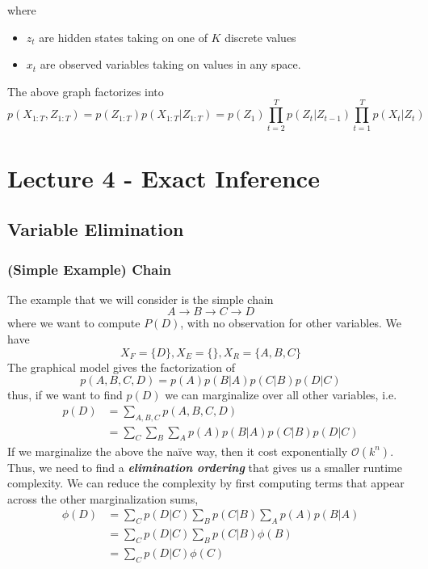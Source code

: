 \documentclass[11pt]{article}
\begin{document}
where
\begin{itemize}
    \item $z_t$ are hidden states taking on one of $K$ discrete values
    \item $x_t$ are observed variables taking on values in any space.
\end{itemize}
The above graph factorizes into
\begin{equation*}
    p\left(X_{1: T}, Z_{1: T}\right)=p\left(Z_{1: T}\right) p\left(X_{1: T} | Z_{1: T}\right)=p\left(Z_{1}\right) \prod_{t=2}^{T} p\left(Z_{t} | Z_{t-1}\right) \prod_{t=1}^{T} p\left(X_{t} | Z_{t}\right)
\end{equation*}

\section{Lecture 4 - Exact Inference}
\subsection{Variable Elimination}
\subsubsection{(Simple Example) Chain}
The example that we will consider is the simple chain
\begin{equation*}
    A \rightarrow B \rightarrow C \rightarrow D
\end{equation*}
where we want to compute $P(D)$, with no observation for other variables. We have
\begin{equation*}
    X_{F}=\{D\}, X_{E}=\{\}, X_{R}=\{A, B, C\}
\end{equation*}
The graphical model gives the factorization of
\begin{equation*}
    p(A, B, C, D)=p(A) p(B | A) p(C | B) p(D | C)
\end{equation*}
thus, if we want to find $p(D)$ we can marginalize over all other variables, i.e.
\begin{align*}
    p(D)&=\sum_{A, B, C} p(A, B, C, D) \\
    &=\sum_{C} \sum_{B} \sum_{A} p(A) p(B | A) p(C | B) p(D | C)
\end{align*}
If we marginalize the above the na\"ive way, then it cost exponentially $\mathcal{O}(k^n)$. Thus, we need to find a \textit{\textbf{elimination ordering}} that gives us a smaller runtime complexity. We can reduce the complexity by first computing terms that appear across the other marginalization sums, 
\begin{align*}
    \phi(D) 
    &= \sum_C p(D|C) \sum_B p(C|B) \sum_A p(A)p(B|A) \\
    &= \sum_C p(D|C) \sum_B p(C|B) \phi(B) \\
    &= \sum_C p(D|C) \phi(C)
\end{align*}
\end{document}
